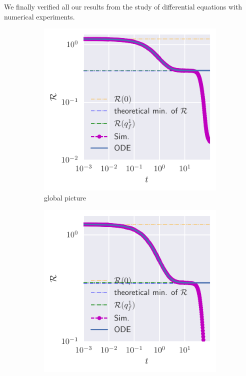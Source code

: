 We finally verified all our results from the study of differential equations with numerical experiments.
\begin{figure}
  \centering
  \begin{subfigure}{0.495\textwidth}
    \includegraphics[width=1.\textwidth]{figures/example-eps0.pdf}
    \caption{global picture}
  \end{subfigure}
  \begin{subfigure}{0.495\textwidth}
    \includegraphics[width=1.\textwidth]{figures/example-eps0-zoomed.pdf}

\end{subfigure}
\end{figure}
